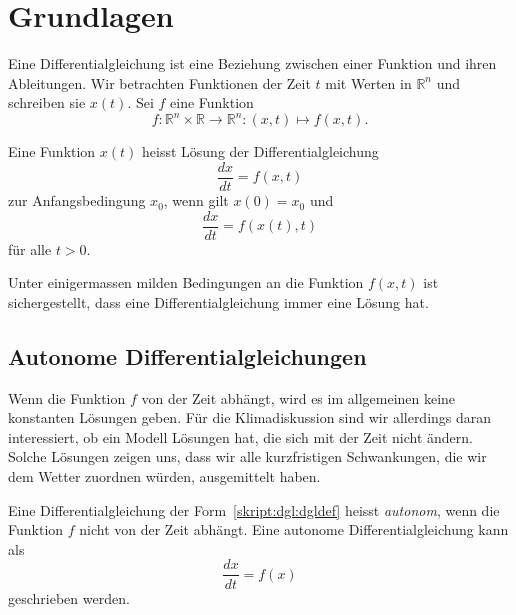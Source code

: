 %
%
%
\section{Grundlagen}
Eine Differentialgleichung ist eine Beziehung zwischen einer Funktion und
ihren Ableitungen.
Wir betrachten Funktionen der Zeit $t$ mit Werten in $\mathbb R^n$
und schreiben sie $x(t)$.
Sei $f$ eine Funktion
\[
f\colon \mathbb R^n\times \mathbb R \to \mathbb R^n: (x,t) \mapsto f(x,t).
\]

\begin{definition}
Eine Funktion $x(t)$ heisst Lösung der Differentialgleichung
\begin{equation}
\frac{dx}{dt} = f(x,t)
\label{skript:dgl:dgldef}
\end{equation}
zur Anfangsbedingung $x_0$, wenn gilt $x(0)=x_0$ und
\[
\frac{dx}{dt} = f(x(t),t)
\]
für alle $t>0$.
\end{definition}

Unter einigermassen milden Bedingungen an die Funktion $f(x,t)$ ist
sichergestellt, dass eine Differentialgleichung immer eine Lösung hat.

\subsection{Autonome Differentialgleichungen}
Wenn die Funktion $f$ von der Zeit abhängt, wird es im allgemeinen
keine konstanten Lösungen geben.
Für die Klimadiskussion sind wir allerdings daran interessiert, ob
ein Modell Lösungen hat, die sich mit der Zeit nicht ändern.
Solche Lösungen zeigen uns, dass wir alle kurzfristigen
Schwankungen, die wir dem Wetter zuordnen würden, ausgemittelt haben.

\begin{definition}
Eine Differentialgleichung der Form~\eqref{skript:dgl:dgldef}
heisst {\em autonom},
%
wenn die Funktion $f$ nicht von der Zeit abhängt.
Eine autonome Differentialgleichung kann als
\[
\frac{dx}{dt} = f(x)
\]
geschrieben werden.
\end{definition}

